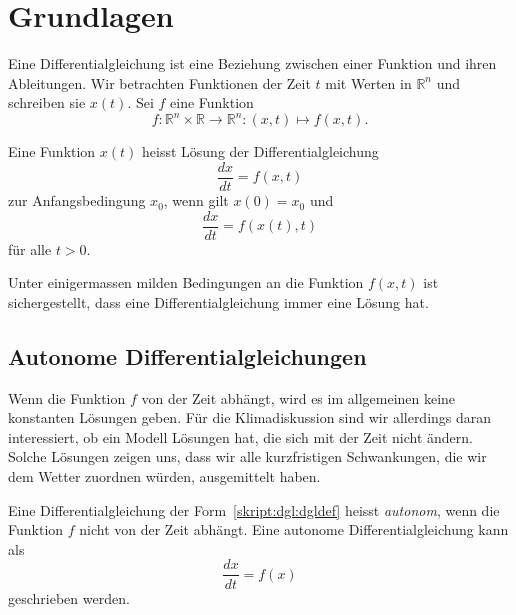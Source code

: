 %
%
%
\section{Grundlagen}
Eine Differentialgleichung ist eine Beziehung zwischen einer Funktion und
ihren Ableitungen.
Wir betrachten Funktionen der Zeit $t$ mit Werten in $\mathbb R^n$
und schreiben sie $x(t)$.
Sei $f$ eine Funktion
\[
f\colon \mathbb R^n\times \mathbb R \to \mathbb R^n: (x,t) \mapsto f(x,t).
\]

\begin{definition}
Eine Funktion $x(t)$ heisst Lösung der Differentialgleichung
\begin{equation}
\frac{dx}{dt} = f(x,t)
\label{skript:dgl:dgldef}
\end{equation}
zur Anfangsbedingung $x_0$, wenn gilt $x(0)=x_0$ und
\[
\frac{dx}{dt} = f(x(t),t)
\]
für alle $t>0$.
\end{definition}

Unter einigermassen milden Bedingungen an die Funktion $f(x,t)$ ist
sichergestellt, dass eine Differentialgleichung immer eine Lösung hat.

\subsection{Autonome Differentialgleichungen}
Wenn die Funktion $f$ von der Zeit abhängt, wird es im allgemeinen
keine konstanten Lösungen geben.
Für die Klimadiskussion sind wir allerdings daran interessiert, ob
ein Modell Lösungen hat, die sich mit der Zeit nicht ändern.
Solche Lösungen zeigen uns, dass wir alle kurzfristigen
Schwankungen, die wir dem Wetter zuordnen würden, ausgemittelt haben.

\begin{definition}
Eine Differentialgleichung der Form~\eqref{skript:dgl:dgldef}
heisst {\em autonom},
%
wenn die Funktion $f$ nicht von der Zeit abhängt.
Eine autonome Differentialgleichung kann als
\[
\frac{dx}{dt} = f(x)
\]
geschrieben werden.
\end{definition}

